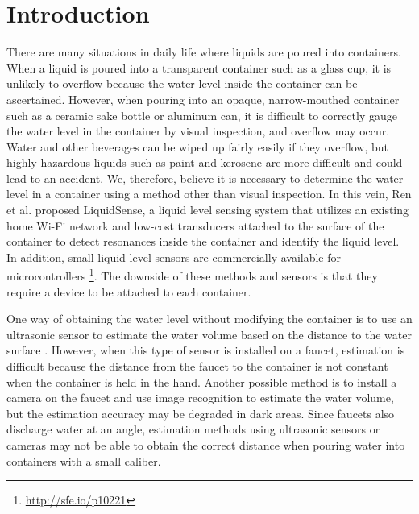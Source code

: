 \documentclass[sigconf,authordraft]{acmart}
\begin{document}
\section{Introduction}
There are many situations in daily life where liquids are poured into containers. When a liquid is poured into a transparent container such as a glass cup, it is unlikely to overflow because the water level inside the container can be ascertained. However, when pouring into an opaque, narrow-mouthed container such as a ceramic sake bottle or aluminum can, it is difficult to correctly gauge the water level in the container by visual inspection, and overflow may occur. Water and other beverages can be wiped up fairly easily if they overflow, but highly hazardous liquids such as paint and kerosene are more difficult and could lead to an accident. We, therefore, believe it is necessary to determine the water level in a container using a method other than visual inspection. In this vein, Ren et al. \cite{LiquidSense} proposed LiquidSense, a liquid level sensing system that utilizes an existing home Wi-Fi network and low-cost transducers attached to the surface of the container to detect resonances inside the container and identify the liquid level. In addition, small liquid-level sensors are commercially available for microcontrollers \footnote{\url{http://sfe.io/p10221}}. The downside of these methods and sensors is that they require a device to be attached to each container.\par

One way of obtaining the water level without modifying the container is to use an ultrasonic sensor to estimate the water volume based on the distance to the water surface \cite{smart_faucet1}. However, when this type of sensor is installed on a faucet, estimation is difficult because the distance from the faucet to the container is not constant when the container is held in the hand. Another possible method is to install a camera on the faucet and use image recognition to estimate the water volume, but the estimation accuracy may be degraded in dark areas. Since faucets also discharge water at an angle, estimation methods using ultrasonic sensors or cameras may not be able to obtain the correct distance when pouring water into containers with a small caliber.\par
\end{document}
